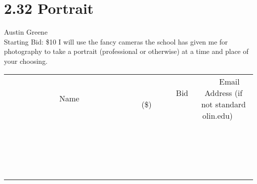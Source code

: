\documentclass[11pt]{article}
\begin{document}
\section*{2.32 Portrait}
Austin Greene
\\
Starting Bid: \$10
\newline
I will use the fancy cameras the school has given me for photography to take a portrait (professional or otherwise) at a time and place of your choosing.
\\[3ex]
\begin{tabular}{c c c}
~~~~~~~~~~~~~Name~~~~~~~~~~~~~ & ~~~~~~~~~Bid (\$)~~~~~~~~~  & ~~~Email Address (if not standard olin.edu)~~~\\
 & & \\
\hline
 & & \\
\hline
 & & \\
\hline
 & & \\
\hline
 & & \\
\hline
 & & \\
\hline
 & & \\
\hline
 & & \\
\hline
 & & \\
\hline
 & & \\
\hline
 & & \\
\hline
 & & \\
\hline
 & & \\
\hline
 & & \\
\hline
 & & \\
\hline
 & & \\
\hline
 & & \\
\hline
 & & \\
\hline
 & & \\
\hline
\end{tabular}
\newpage
\end{document}
